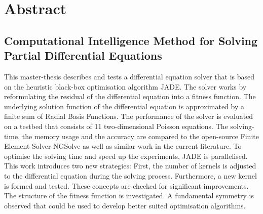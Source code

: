\documentclass[./\jobname.tex]{subfiles}
\begin{document}
\chapter*{Abstract}
\section*{Computational Intelligence Method for Solving Partial Differential Equations}
%
This master-thesis describes and tests a differential equation solver that is based on the heuristic black-box optimisation algorithm JADE. The solver works by reformulating the residual of the differential equation into a fitness function. The underlying solution function of the differential equation is approximated by a finite sum of Radial Basis Functions. The performance of the solver is evaluated on a testbed that consists of 11 two-dimensional Poisson equations. The solving-time, the memory usage and the accuracy are compared to the open-source Finite Element Solver NGSolve as well as similar work in the current literature. To optimise the solving time and speed up the experiments, JADE is parallelised. This work introduces two new strategies: First, the number of kernels is adjusted to the differential equation during the solving process. Furthermore, a new kernel is formed and tested. These concepts are checked for significant improvements. The structure of the fitness function is investigated. A fundamental symmetry is observed that could be used to develop better suited optimisation algorithms. 
%
\end{document}
